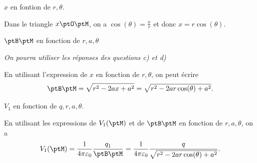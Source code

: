 
\begin{enonce}
	$x$ en fontion de $r,\theta$.
\end{enonce}


\begin{corrige}
	Dans le triangle $x\ptO\ptM$, on a $\cos (\theta) = \frac{x}{r}$ et donc $x = r\cos(\theta)$.
\end{corrige}





\begin{enonce}
	$\ptB\ptM$ en fonction de $r,a,\theta$ \minusMedskip
	
	{\itshape On pourra utiliser  les réponses des questions c) et d)}
\end{enonce}


\begin{corrige}
	En utilisant l'expression de $x$ en fonction de $r,\theta$, on peut écrire
	\[
		\ptB\ptM = \sqrt{r^2 - 2ax + a^2 }= \sqrt{ r^2  - 2ar \cos (\theta) + a^2 }.
	\]
\end{corrige}





\begin{enonce}
	$V_1$ en fonction de $q, r, a, \theta$.
\end{enonce}


\begin{corrige}
	En utilisant les expressions de $V_1(\ptM)$ et de $\ptB\ptM$ en fonction de $r,a,\theta$,
	on a  
	\[
		V_1(\ptM) = \frac{1}{4\pi\varepsilon_0}\frac{q_1}{\ptB\ptM} = \frac{1}{4\pi\varepsilon_0}\frac{q}{\sqrt{ r^2  - 2ar \cos (\theta) + a^2 }}
	.\]
\end{corrige}

